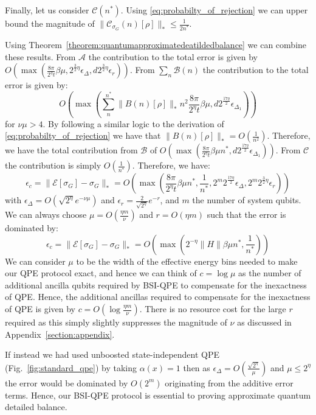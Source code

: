\documentclass[aps,floatfix,10pt,amssymb,amsfont,amsmath,superscriptaddress,float,nofootinbib,longbibliography,nobalancelastpage,twocolumn]{revtex4-2}
\begin{document}
\begin{widetext}
Finally, let us consider $\mathcal{C}(n^*)$. Using \eqref{eq:probabilty_of_rejection} we can upper bound the magnitude of $\|\mathcal{C}_{\sigma_G}(n)[\rho]\|_{*}\leq\frac{1}{2n^*}$.


Using Theorem~\ref{theorem:quantumapproximatedeatildedbalance} we can combine these results. From $\mathcal{A}$ the contribution to the total error is given by $O(\max(\frac{8\pi}{2^{\eta}t}\beta\mu,2^{\frac{3}{2}\eta}\epsilon_{\Delta}, d2^{\frac{3}{2}\eta}\epsilon_r))$. From $\sum_n\mathcal{B}(n)$ the contribution to the total error is given by:
\begin{equation}
    O(\max(\sum^{n^*}_{n}\|B(n)[\rho]\|_* n^{2}\frac{8\pi}{2^{\eta}t}\beta \mu ,d2^{\frac{17\eta}{2}}\epsilon_{\Delta_{1}}))
\end{equation}
for $\nu \mu > 4$. By following a similar logic to the derivation of \eqref{eq:probabilty_of_rejection} we have that $\|B(n)[\rho]\|_* = O(\frac{1}{n^2})$. Therefore, we have the total contribution from $\mathcal{B}$ of $O(\max(\frac{8\pi}{2^{\eta}t}\beta \mu n^*,d2^{\frac{17\eta}{2}}\epsilon_{\Delta_{1}}))$. From $\mathcal{C}$ the contribution is simply $O(\frac{1}{n^*})$. Therefore, we have:
 \begin{equation}
   \epsilon_c = \|\mathcal{E}[\sigma_G] - \sigma_G\|_* = O\left(\max\left( \frac{8\pi}{2^{\eta}t}\beta\mu n^* ,\frac{1}{n^*}, 2^m2^{\frac{17\eta}{2}}\epsilon_{\Delta}, 2^m2^{\frac{3}{2}\eta}\epsilon_r\right)\right)
\end{equation}
with $\epsilon_{\Delta}=O(\sqrt{2^{\eta}}e^{-\nu\mu})$ and  $\epsilon_r = \frac{2}{\sqrt{2^{\eta}}}e^{-r}$, and $m$ the number of system qubits. We can always choose $\mu = O(\frac{\eta m}{\nu})$ and $r=O(\eta m)$ such that the error is dominated by:
 \begin{equation}
   \epsilon_c = \|\mathcal{E}[\sigma_G] - \sigma_G\|_* = O\left(\max\left( 2^{-\eta}\|H\|\beta\mu n^* ,\frac{1}{n^*}\right)\right)
    \label{eq:error_bound}
\end{equation}
We can consider $\mu$ to be the width of the effective energy bins needed to make our QPE protocol exact, and hence we can think of $c = \log \mu$ as the number of additional ancilla qubits required by BSI-QPE to compensate for the inexactness of QPE. Hence, the additional ancillas required to compensate for the inexactness of QPE is given by $c = O(\log \frac{\eta m}{\nu})$. There is no resource cost for the large $r$ required as this simply slightly suppresses the magnitude of $\nu$ as discussed in Appendix~\ref{section:appendix}.

If instead we had used unboosted state-independent QPE (Fig.~\ref{fig:standard_qpe}) by taking $\alpha(x) =1$ then as $\epsilon_{\Delta} = O(\frac{\sqrt{2^{\eta}}}{\mu})$ and $\mu \leq 2^{\eta}$ the error would be dominated by $O(2^m)$ originating from the additive error terms. Hence, our BSI-QPE protocol is essential to proving approximate quantum detailed balance.
\end{widetext}
\end{document}
